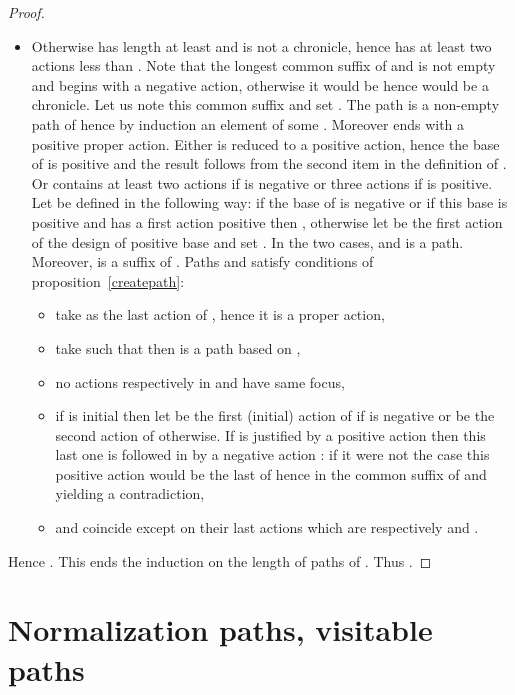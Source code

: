 \documentclass{LMCS}
\begin{document}
\begin{proof}
\begin{itemize}[label=]
\item Otherwise  has length at least  and is not a chronicle, hence  has at least two actions less than . 
Note that the longest common suffix of  and  is not empty and begins with a negative action, otherwise it would be  hence  would be a chronicle. 
Let us note this common suffix  and set . The path  is a non-empty path of  hence by induction an element of some . Moreover  ends with a positive proper action.
Either  is reduced to a positive action, hence the base of  is positive and the result follows from the second item in the definition of .
Or  contains at least two actions if  is negative or three actions if  is positive.
Let  be defined in the following way: if the base of  is negative or if this base is positive and  has a first action positive then , otherwise let  be the first action of the design of positive base and set . In the two cases,  and is a path.
Moreover,  is a suffix of . 
Paths  and  satisfy conditions of
proposition~\ref{createpath}:
\begin{itemize}[label=]
\item take  as the last action of , hence it is a proper action,
\item take  such that  then  is a path based on ,
\item no actions respectively  in  and   have same focus,
\item if  is initial then let  be the first (initial)  action of  if  is negative or be the second action of  otherwise. If   is justified by a positive action then this last one is followed in  by a negative action : if it were not the case this positive action would be the last of  hence in the common suffix of  and  yielding a contradiction, 
\item  and  coincide
  except on their last actions which are respectively  and
  .
\end{itemize}
\end{itemize}
Hence . 
This ends the induction on the length of paths of .
Thus .
\end{proof}




\section{Normalization paths, visitable paths}\label{section:normalization_visitable}
\end{document}

